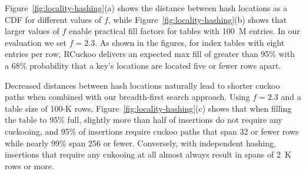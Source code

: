 Figure~\ref{fig:locality-hashing}(a) shows the distance between hash
locations as a CDF for different values of $f$,
while Figure~\ref{fig:locality-hashing}(b) shows that larger values of
$f$ enable practical fill factors for tables with 100~M entries. In
our evaluation we set $f=2.3$.  As shown in the figures, for index
tables with eight entries per row, RCuckoo delivers an expected max fill of
greater than 95\% with a 68\% probability that a key's locations are
located five or fewer rows apart.


Decreased distances between hash locations naturally lead to shorter
cuckoo paths when combined with our breadth-first search approach.
Using $f=2.3$ and a table size of 100-K rows,
Figure~\ref{fig:locality-hashing}(c) shows that when filling the table
to 95\% full, slightly more than half of insertions do not require any
cuckooing, and 95\% of insertions require cuckoo paths that span 32 or
fewer rows while nearly 99\% span 256 or fewer.  Conversely, with
independent hashing, insertions that require any cukooing at all
almost always result in spans of 2~K rows or more.
%



